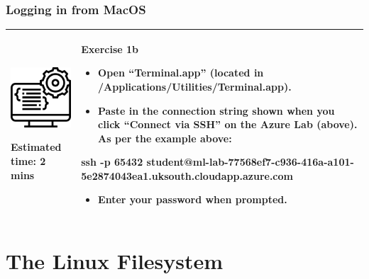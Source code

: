 \documentclass[
  english,
  paper=a4,
  ,captions=tableheading
]{scrartcl}
\newenvironment{Shaded}{\begin{snugshade}}{\end{snugshade}}
\newcommand{\FunctionTok}[1]{\textcolor[rgb]{0.00,0.00,0.00}{#1}}
\newcommand{\NormalTok}[1]{#1}
\providecommand{\tightlist}{%
  \setlength{\itemsep}{0pt}\setlength{\parskip}{0pt}}
\begin{document}
\hypertarget{logging-in-from-macos}{%
\subsubsection{Logging in from MacOS}\label{logging-in-from-macos}}

\begin{longtable}[]{@{}ll@{}}
\toprule
\endhead
\begin{minipage}[t]{0.36\columnwidth}\raggedright
\includegraphics[width=1.5625in,height=\textheight]{media/programming.png}

Estimated time: 2 mins\strut
\end{minipage} & \begin{minipage}[t]{0.58\columnwidth}\raggedright
\textbf{Exercise 1b}

\begin{itemize}
\tightlist
\item
  Open \enquote{Terminal.app} (located in
  /Applications/Utilities/Terminal.app).
\item
  Paste in the connection string shown when you click \enquote{Connect
  via SSH} on the Azure Lab (above). As per the example above:
\end{itemize}

\begin{Shaded}
\begin{Highlighting}[]
\FunctionTok{ssh}\NormalTok{ -p 65432 student@ml-lab-77568ef7-c936-416a-a101-5e2874043ea1.uksouth.cloudapp.azure.com}
\end{Highlighting}
\end{Shaded}

\begin{itemize}
\tightlist
\item
  Enter your password when prompted.
\end{itemize}\strut
\end{minipage}\tabularnewline
\bottomrule
\end{longtable}

\hypertarget{the-linux-filesystem}{%
\section{The Linux Filesystem}\label{the-linux-filesystem}}
\end{document}

